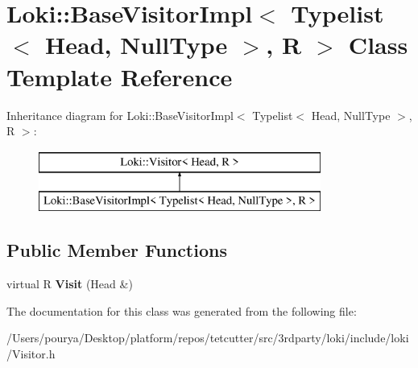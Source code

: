 \hypertarget{classLoki_1_1BaseVisitorImpl_3_01Typelist_3_01Head_00_01NullType_01_4_00_01R_01_4}{}\section{Loki\+:\+:Base\+Visitor\+Impl$<$ Typelist$<$ Head, Null\+Type $>$, R $>$ Class Template Reference}
\label{classLoki_1_1BaseVisitorImpl_3_01Typelist_3_01Head_00_01NullType_01_4_00_01R_01_4}
Inheritance diagram for Loki\+:\+:Base\+Visitor\+Impl$<$ Typelist$<$ Head, Null\+Type $>$, R $>$\+:\begin{figure}[H]
\begin{center}
\leavevmode
\includegraphics[height=2.000000cm]{classLoki_1_1BaseVisitorImpl_3_01Typelist_3_01Head_00_01NullType_01_4_00_01R_01_4}
\end{center}
\end{figure}
\subsection*{Public Member Functions}
\begin{DoxyCompactItemize}
\item 
\hypertarget{classLoki_1_1BaseVisitorImpl_3_01Typelist_3_01Head_00_01NullType_01_4_00_01R_01_4_aec115d0f143b210401af894c49fe27cf}{}virtual R {\bfseries Visit} (Head \&)\label{classLoki_1_1BaseVisitorImpl_3_01Typelist_3_01Head_00_01NullType_01_4_00_01R_01_4_aec115d0f143b210401af894c49fe27cf}

\end{DoxyCompactItemize}


The documentation for this class was generated from the following file\+:\begin{DoxyCompactItemize}
\item 
/\+Users/pourya/\+Desktop/platform/repos/tetcutter/src/3rdparty/loki/include/loki/Visitor.\+h\end{DoxyCompactItemize}
